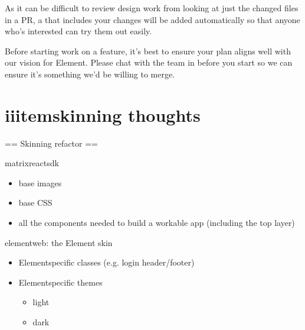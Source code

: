 \documentclass[letterpaper,10pt,openany,oneside,english]{sphinxmanual}
\begin{document}
\sphinxAtStartPar
As it can be difficult to review design work from looking at just the changed
files in a PR, a  that includes your changes
will be added automatically so that anyone who’s interested can try them out
easily.

\sphinxAtStartPar
Before starting work on a feature, it’s best to ensure your plan aligns well
with our vision for Element. Please chat with the team in
 before
you start so we can ensure it’s something we’d be willing to merge.


\chapter{iiitemskinning thoughts}
\label{\detokenize{skinning thoughts:iiitemskinning-thoughts}}\label{\detokenize{skinning thoughts::doc}}
\sphinxAtStartPar
== Skinning refactor ==

\sphinxAtStartPar
matrix\sphinxhyphen{}react\sphinxhyphen{}sdk
\begin{itemize}
\item {} 
\sphinxAtStartPar
base images

\item {} 
\sphinxAtStartPar
base CSS

\item {} 
\sphinxAtStartPar
all the components needed to build a workable app (including the top layer)

\end{itemize}

\sphinxAtStartPar
element\sphinxhyphen{}web: the Element skin
\begin{itemize}
\item {} 
\sphinxAtStartPar
Element\sphinxhyphen{}specific classes (e.g. login header/footer)

\item {} 
\sphinxAtStartPar
Element\sphinxhyphen{}specific themes
\begin{itemize}
\item {} 
\sphinxAtStartPar
light

\item {} 
\sphinxAtStartPar
dark

\end{itemize}

\end{itemize}
\end{document}
